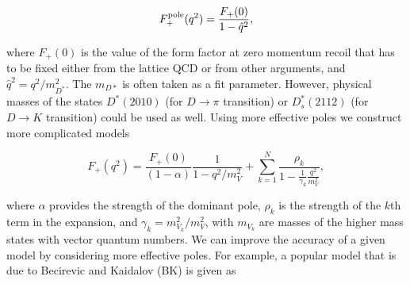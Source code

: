 \begin{equation}\label{FF_Pole}
F_+^{\rm pole}(q^2) = \frac{F_+(0)}{1-{\hat q}^2},
\end{equation}

where $F_+(0)$ is the value of the form factor at zero momentum recoil that has to be fixed either from the lattice QCD or from other arguments, and $\hat{q}^2=q^2/m_{D^*}^2$. The $m_{D*}$ is often taken as a fit parameter. However, physical masses of the states $D^*(2010)$ (for $D\to \pi$ transition) or $D^*_s(2112)$ (for $D\to K$ transition) could be used as well. Using more effective poles we construct more complicated models \cite{Grant:2019yar}

%
\begin{equation}\label{FF_ManyPoles}
F_+(q^2)=\frac{F_+(0)}{(1-\alpha)}\frac{1}{1-q^2/m_V^2}+
\sum_{k=1}^N \frac{\rho _k}{1-\frac{1}{\gamma_k}\frac{q^2}{m_V^2}},
\end{equation}

where $\alpha$  provides the strength of the dominant pole, $\rho_k$ is the strength of the $k$th term in the expansion, and
$\gamma _k=m_{V_k}^2/m_V^2$, with $m_{V_k}$ are masses of the higher mass states with vector quantum numbers. We can improve the accuracy of a given model by considering more effective poles. For example, a popular model that is due to Becirevic and Kaidalov (BK)\cite{Becirevic:1999kt} is given as 

